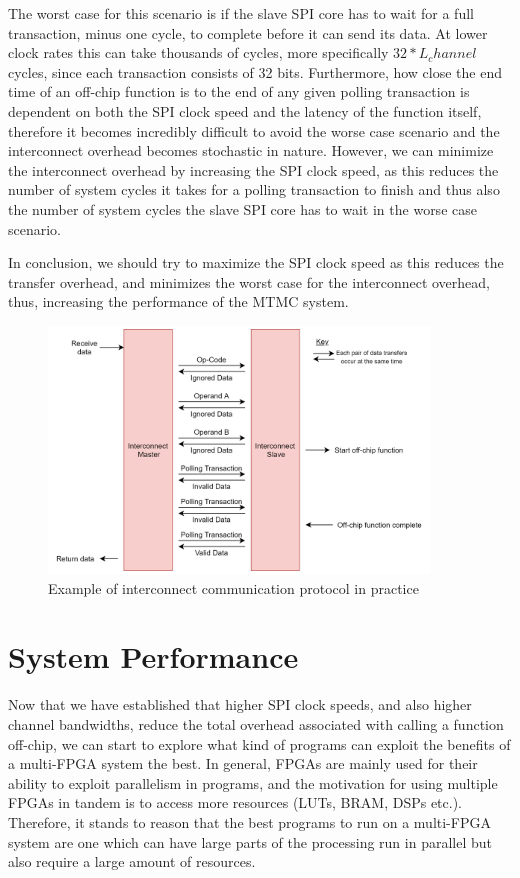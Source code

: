 The worst case for this scenario is if the slave SPI core has to wait for a full transaction, minus one cycle, to complete before it can send its data. At lower clock rates this can take thousands of cycles, more specifically $32 * L_channel$ cycles, since each transaction consists of 32 bits. Furthermore, how close the end time of an off-chip function is to the end of any given polling transaction is dependent on both the SPI clock speed and the latency of the function itself, therefore it becomes incredibly difficult to avoid the worse case scenario and the interconnect overhead becomes stochastic in nature. However, we can minimize the interconnect overhead by increasing the SPI clock speed, as this reduces the number of system cycles it takes for a polling transaction to finish and thus also the number of system cycles the slave SPI core has to wait in the worse case scenario.

In conclusion, we should try to maximize the SPI clock speed as this reduces the transfer overhead, and minimizes the worst case for the interconnect overhead, thus, increasing the performance of the MTMC system.


\begin{figure}[!htb]
    \centering
    \includegraphics[width=0.9\textwidth]{05_evaluation/images/interconnect_polling.png}
    \caption{Example of interconnect communication protocol in practice}
    \label{fig:interconnect_polling}
\end{figure}


\section{System Performance}
\label{sec:sys_perf}

Now that we have established that higher SPI clock speeds, and also higher channel bandwidths, reduce the total overhead associated with calling a function off-chip, we can start to explore what kind of programs can exploit the benefits of a multi-FPGA system the best. In general, FPGAs are mainly used for their ability to exploit parallelism in programs, and the motivation for using multiple FPGAs in tandem is to access more resources (LUTs, BRAM, DSPs etc.). Therefore, it stands to reason that the best programs to run on a multi-FPGA system are one which can have large parts of the processing run in parallel but also require a large amount of resources.

